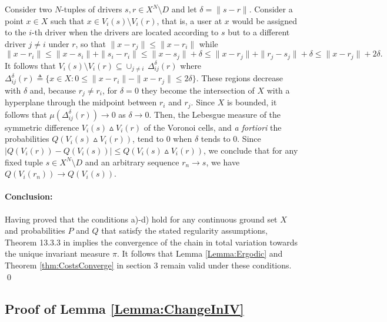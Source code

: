 \documentclass[12pt,english]{article}
\begin{document}
{\vspace{1ex}
 Consider two $N$-tuples of drivers $s,r \in X^N\setminus D$ and let  $\delta=\|s-r\|$. Consider a point $x \in X$ such that $x \in V_i(s)\setminus V_i(r)$, that is, a user at $x$ would be assigned to the $i$-th driver when the drivers are located according to $s$ but to a different driver $j\neq i$ under $r$, so that
$\|x - r_j\|\leq\|x - r_i\|$ while 
$$\|x - r_i\| \leq \|x - s_i\| + \|s_i - r_i\|\leq\|x - s_j\| + \delta \leq\|x - r_j\| + \|r_j - s_j\| + \delta \leq\|x - r_j\| + 2 \delta.
$$
It follows that $V_i(s)\setminus V_i(r)\subseteq\cup_{j\neq i}\,\Delta_{ij}^\delta(r)$ where
$\Delta_{ij}^\delta(r)\triangleq \{x\in X:0\leq \|x-r_i\|-\|x-r_j\|\leq 2\delta\}$. These regions decrease with $\delta$ and, because $r_j\neq r_i$, for $\delta=0$ they become the intersection of $X$ with a hyperplane through the midpoint between $r_i$ and $r_j$.
Since $X$ is bounded, it follows that $\mu(\Delta_{ij}^\delta(r))\to 0$ as $\delta\to 0$. Then, 
the Lebesgue measure of the symmetric difference $V_i(s)\!\vartriangle\! V_i(r)$ of the Voronoi cells, and {\em a fortiori} the probabilities $Q(V_i(s)\!\vartriangle\! V_i(r))$, tend to 0 
when $\delta$ tends to 0.
Since $|Q(V_i(r))-Q(V_i(s))|\leq Q(V_i(s)\!\vartriangle \! V_i(r))$, we conclude that for any fixed tuple $s\in X^N\setminus D$ and an arbitrary sequence $r_n\to s$, we have $Q(V_i(r_n))\to Q(V_i(s))$. 


 \paragraph{Conclusion:} Having proved that the conditions a)-d) hold  for any continuous ground set $X$ and probabilities $P$ and $Q$ that satisfy the stated regularity assumptions, Theorem 13.3.3 in \cite{meyn2012markov} implies the convergence of the chain in total variation  towards the unique invariant measure $\pi$. It follows that Lemma \ref{Lemma:Ergodic}
and Theorem \ref{thm:CostsConverge} in section 3 remain valid under these conditions.
\qed


\subsection*{Proof of Lemma \ref{Lemma:ChangeInIV}}

}
\end{document}
